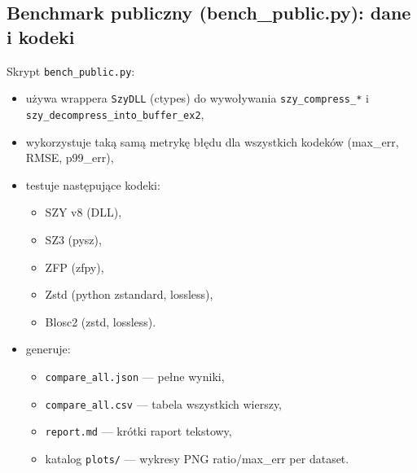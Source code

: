 \documentclass[11pt,a4paper]{article}
\begin{document}
\subsection{Benchmark publiczny (bench\_public.py): dane i kodeki}
Skrypt \texttt{bench\_public.py}:
\begin{itemize}
  \item używa wrappera \texttt{SzyDLL} (ctypes) do wywoływania \texttt{szy\_compress\_*} i \texttt{szy\_decompress\_into\_buffer\_ex2},
  \item wykorzystuje taką samą metrykę błędu dla wszystkich kodeków (max\_err, RMSE, p99\_err),
  \item testuje następujące kodeki:
        \begin{itemize}
          \item SZY v8 (DLL),
          \item SZ3 (pysz),
          \item ZFP (zfpy),
          \item Zstd (python zstandard, lossless),
          \item Blosc2 (zstd, lossless).
        \end{itemize}
  \item generuje:
        \begin{itemize}
          \item \texttt{compare\_all.json} --- pełne wyniki,
          \item \texttt{compare\_all.csv} --- tabela wszystkich wierszy,
          \item \texttt{report.md} --- krótki raport tekstowy,
          \item katalog \texttt{plots/} --- wykresy PNG ratio/max\_err per dataset.
        \end{itemize}
\end{itemize}
\end{document}
